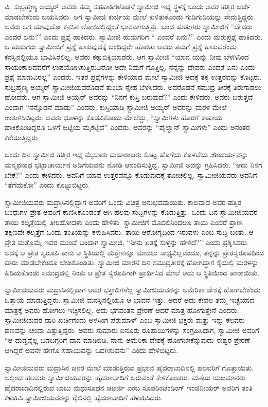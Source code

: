  ವಿ. ಸುಬ್ರಹ್ಮಣ್ಯ ಅಯ್ಯರ್ ಅವರು ತಮ್ಮ ಸಹಪಾಠಿಗಳೊಡನೆ ಸ್ವಾಮೀಜಿ ಇದ್ದ ಸ್ಥಳಕ್ಕೆ ಬಂದು ಅವರ ಹತ್ತಿರ ಚರ್ಚೆ ಮಾಡಬೇಕೆಂದು ಬಯಸಿದರು. ಆಗ ಸ್ವಾಮೀಜಿ ಕುರ್ಚಿಯ ಮೇಲೆ ಕುಳಿತುಕೊಂಡು ಗುಡಿಗುಡಿಯನ್ನು ಸೇದುತ್ತಿದ್ದರು. ಅವರು ಆಗ ಯಾವುದೋ ಕನಸಿನ ಲೋಕದಲ್ಲಿದ್ದಂತೆ ಭಾಸವಾಗುತ್ತಿತ್ತು. ಬಂದ ಹುಡುಗರು ಸ್ವಾಮೀಜಿಗೆ “ದೇವರು ಎಂದರೆ ಏನು?” ಎಂದು ಪ್ರಶ್ನೆ ಹಾಕಿದರು. ಸ್ವಾಮೀಜಿ ಹುಡುಗರಿಗೆ “ ಎಂದರೆ ಏನು?” ಎಂದು ಮರುಪ್ರಶ್ನೆ ಹಾಕಿದರು. ಆ ಹುಡುಗರು ಸ್ವಾಮೀಜಿಗೆ ಪ್ರಶ್ನೆ ಹಾಕುವುದಕ್ಕೆ ಬಂದಿದ್ದರೇ ಹೊರತು ಅವರು ತಮಗೆ ಪ್ರಶ್ನೆ ಹಾಕುವರೆಂದು ಕನಸ್ಸಿನಲ್ಲಿಯೂ ಭಾವಿಸಿರಲಿಲ್ಲ. ಅವರು ಕಕ್ಕಾಬಿಕ್ಕಿಯಾದರು. ಆಗ ಸ್ವಾಮೀಜಿ “ಯಾವ ಯನ್ನು ನೀವು ಬೆಳಗಿನಿಂದ ಸಾಯಂಕಾಲದವರೆಗೆ ಉಪಯೋಗಿಸುತ್ತಿರುವಿರೋ ಅದೇ ನಿಮಗೆ ಗೊತ್ತಿಲ್ಲ. ನನ್ನನ್ನು ದೇವರು ಎಂದರೆ ಏನು ಎಂದು ಪ್ರಶ್ನೆ ಮಾಡುವಿರಲ್ಲ” ಎಂದರು. ಇತರ ಪ್ರಶ್ನೆಗಳನ್ನು ಕೇಳಿಯಾದ ಮೇಲೆ ಸ್ವಾಮೀಜಿ ಅದಕ್ಕೆ ತಕ್ಕ ಉತ್ತರವನ್ನು ಕೊಟ್ಟರು. ಸುಬ್ರಹ್ಮಣ್ಯ ಅಯ್ಯರ್ ಸ್ವಾಮೀಜಿಯವರೊಡನೆ ತುಂಬಾ ಸ್ನೇಹ ಬೆಳಸಿದರು. ಅವರೊಡನೆ ಸಮುದ್ರ ತೀರಕ್ಕೆ ತಿರುಗಾಡಲು ಹೋದರು. ಆಗ ಸ್ವಾಮೀಜಿ ಅಯ್ಯರ್ ಅವರನ್ನು “ನಿನಗೆ ಕುಸ್ತಿ ಬರುವುದೆ?” ಎಂದು ಕೇಳಿದರು. ಅವರು ಬರುತ್ತದೆ ಎಂದಾಗ “ನನ್ನೊಡನೆ ಮಾಡು” ಎಂದರು. ಕುಸ್ತಿಯಾಡಿ ಸ್ವಾಮೀಜಿ ಅಯ್ಯರ್ ಅವರನ್ನು ಮರಳ ಮೇಲೆ ಉರುಳಿಸಿಬಿಟ್ಟರು. ಅವರು ಧೂಳನ್ನು ಕೊಡವಿಕೊಂಡು ಮೇಲೆದ್ದು, “ಸ್ವಾಮಿಗಳು ಹೊರಗೆ ಕಾಷಾಯ ಹಾಕಿಕೊಂಡಿದ್ದರೂ ಒಳಗೆ ಜಟ್ಟಿಯ ಮೈಕಟ್ಟಿದೆ” ಎಂದರು. ಅವರನ್ನು “ಪೈಲ್ವಾನ್ ಸ್ವಾಮಿಗಳು” ಎಂದು ಅನಂತರ ಕರೆಯುತ್ತಿದ್ದರು.

 ಒಂದು ದಿನ ಸ್ವಾಮೀಜಿ ಹತ್ತಿರ ಇದ್ದ ಮೈಸೂರು ಮಹಾರಾಜರು ಕೊಟ್ಟ ಹೊಗೆಯ ಕೊಳವೆಯ ಸೌಂದರ್ಯವನ್ನು ಮನ್ಮಥನಾಥ ಭಟ್ಟಾಚಾರ್ಯನ ಅಡಿಗೆಯವನು ನೋಡಿ ಆನಂದಿಸುತ್ತಿದ್ದ. ಸ್ವಾಮೀಜಿ ಅದನ್ನು ಗ್ರಹಿಸಿದರು. “ಅದು ನಿನಗೆ ಬೇಕೆ?” ಎಂದು ಕೇಳಿದರು. ಅವನಿಗೆ ಯಾವ ಉತ್ತರವನ್ನೂ ಕೊಡುವುದಕ್ಕೆ ತೋಚಲಿಲ್ಲ. ಸ್ವಾಮೀಜಿಯವರು ಅವನಿಗೆ “ತೆಗೆದುಕೋ” ಎಂದು ಕೊಟ್ಟುಬಿಟ್ಟರು. 

 ಸ್ವಾಮೀಜಿಯವರು ಮದ್ರಾಸಿನಲ್ಲಿದ್ದಾಗ ಅವರಿಗೆ ಒಂದು ವಿಚಿತ್ರ ಅನುಭವವಾಯಿತು. ಕಾಲವಾದ ಅವರ ಹತ್ತಿರ ಬಂಧುಗಳ ಪ್ರೇತ ಅವರಿಗೆ ಕಾಣಿಸಿಕೊಂಡಂತೆ ಆಗಿ ಹಲವು ಸುದ್ದಿಗಳನ್ನು ಕೊಡುತ್ತಿತ್ತು. ಒಂದು ದಿನ ಸ್ವಾಮೀಜಿಯವರ ತಾಯಿ ಕಲ್ಕತ್ತೆಯಲ್ಲಿ ತೀರಿಹೋದಳು ಎಂದು ಹೇಳಿತು. ಸ್ವಾಮೀಜಿಗೆ ಮೊದಲಿನಿಂದಲೂ ತಾಯಿ ಎಂದರೆ ಪ್ರಾಣ. ತಕ್ಷಣವೇ ಕಲ್ಕತ್ತೆಗೆ ಒಂದು ತಂತಿಯನ್ನು ಕಳುಹಿಸಿದರು. ತಾಯಿ ಆರೋಗ್ಯದಿಂದ ಇರುವಳು ಎಂಬ ಸುದ್ದಿ ಬಂತು. ಆ ಪ್ರೇತ ಮತ್ತೊಮ್ಮೆ ಇವರ ಮುಂದೆ ಬಂದಾಗ ಸ್ವಾಮೀಜಿ, “ನೀನು ಏತಕ್ಕೆ ಸುಳ್ಳನ್ನು ಹೇಳಿದೆ?” ಎಂದು ಪ್ರಶ್ನಿಸಿದರು. ಅದಕ್ಕೆ ಆ ಪ್ರೇತ ಸ್ವರೂಪಿ ತಾನು ಆ ಸ್ಥಿತಿಯಲ್ಲಿ ಮತ್ತೇನನ್ನೂ ಮಾಡಲು ಸಾಧ್ಯವಿಲ್ಲವೆಂದೂ, ತನ್ನನ್ನು ಪ್ರೇತಸ್ವರೂಪದಿಂದ ಪಾರು ಮಾಡಬೇಕೆಂದೂ ಬೇಡಿಕೊಂಡಿತು. ಸ್ವಾಮೀಜಿ ಮಾರನೆ ದಿನ ಸಮುದ್ರತೀರಕ್ಕೆ ಹೋಗಿದ್ದಾಗ ಕೈಯಲ್ಲಿ ಮರಳನ್ನು ಹಿಡಿದುಕೊಂಡು ಸಮುದ್ರದಲ್ಲಿ ನಿಂತು ಆ ಪ್ರೇತ ಸ್ವರೂಪಿಗಾಗಿ ಪ್ರಾರ್ಥಿಸಿದ ಮೇಲೆ ಅದು ಆ ಸ್ಥಿತಿಯಿಂದ ಪಾರಾಯಿತು. 

 ಸ್ವಾಮೀಜಿಯವರು ಮದ್ರಾಸಿನಲ್ಲಿದಾಗ ಅವರ ಭಕ್ತಾದಿಗಳೆಲ್ಲ ಸ್ವಾಮೀಜಿಯವರನ್ನು ಅಮೆರಿಕಾ ದೇಶಕ್ಕೆ ಹೋಗಬೇಕೆಂದು ಒತ್ತಾಯ ಮಾಡುತ್ತಿದ್ದರು. ಸ್ವಾಮೀಜಿ ಮನಸ್ಸಿನಲ್ಲಿಯೂ ಆ ಭಾವನೆ ಇತ್ತು. ಆದರೆ ಅದು ಕೇವಲ ತಮ್ಮ ಇಚ್ಛೆಯಾದ ಮಾತ್ರಕ್ಕೆ ಅವರು ಹೋಗಲು ಇಚ್ಛಿಸಲಿಲ್ಲ. ಅದು ಭಗವಂತನ ಪ್ರೇರಣೆ ಆದರೆ ಮಾತ್ರ ಹೋಗುತ್ತೇನೆ ಎಂದರು. ಸ್ವಾಮೀಜಿಯವರ ದಾರಿ ಖರ್ಚಿಗೆಂದು ಅಳಸಿಂಗ ಪೆರುಮಾಳ್ ಎಂಬ ಸ್ವಾಮೀಜಿ ಭಕ್ತರು ಮತ್ತು ಇನ್ನು ಕೆಲವರು ಹಣವನ್ನು ಚಂದಾ ಎತ್ತುತ್ತಿದ್ದರು. ಅವರು ಸುಮಾರು ಐನೂರು ರೂಪಾಯಿಗಳನ್ನು ಸಂಗ್ರಹಿಸಿದಾಗ, ಸ್ವಾಮೀಜಿ ಅವರಿಗೆ “ಆ ದುಡ್ಡನ್ನೆಲ್ಲ ಬಡಬಗ್ಗರಿಗೆ ದಾನ ಮಾಡಿಬಿಡಿ. ನಾನು ಅಮೆರಿಕಾ ದೇಶಕ್ಕೆ ಹೋಗಬೇಕೆನ್ನುವುದು ಈಶ್ವರ ಪ್ರೇರಣೆ ಆಗಿದ್ದರೆ ಅವನೇ ಹೇಗೊ ಸಹಾಯವನ್ನು ಒದಗಿಸುವನು” ಎಂದು ಹೇಳಿಬಿಟ್ಟರು. 

 ಸ್ವಾಮೀಜಿಯವರು ಮದ್ರಾಸಿನ ಜನರ ಮೇಲೆ ಮಾಡುತ್ತಿರುವ ಪ್ರಭಾವ ಹೈದರಾಬಾದಿನಲ್ಲಿ ಹಲವರಿಗೆ ಗೊತ್ತಾಯಿತು. ಅಲ್ಲಿಂದ ಹಲವರು ಸ್ವಾಮೀಜಿಯವರನ್ನು ಹೈದರಾಬಾದಿಗೆ ಬರುವಂತೆ ಕೇಳಿಕೊಂಡರು. ಮನೆಯ ಯಜಮಾನರು ಹೈದರಾಬಾದಿನಲ್ಲಿರುವ ಬಾಬು ಮಧುಸೂಧನ ಚಟರ್ಜಿ ಎಂಬ ಸೂಪರಿಂಟೆಂಡಿಂಗ್ ಇಂಜಿನೀಯರ್ ಅವರಿಗೆ ತಂತಿ ಕಳುಹಿಸಿ ಸ್ವಾಮೀಜಿಯವರನ್ನು ರೈಲಿನಲ್ಲಿ ಹೈದರಾಬಾದಿಗೆ ಹಳುಹಿಸಿದರು. 

